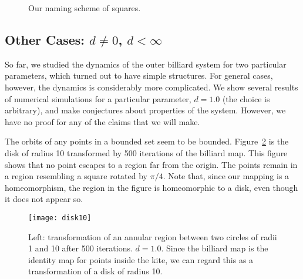 \documentclass[10pt,twoside,draft]{book}
\begin{document}
\begin{figure}[ht]
  \centering

  \caption{Our naming scheme of squares.}
  \label{fig:grid}

\end{figure}

\subsection*{Other Cases: $d \neq 0$, $d < \infty$}
So far, we studied the dynamics of the outer billiard system for two particular parameters, which turned out to have simple structures.
For general cases, however, the dynamics is considerably more complicated.
We show several results of numerical simulations for a particular parameter, $d = 1.0$ (the choice is arbitrary), and make conjectures about properties of the system.
However, we have no proof for any of the claims that we will make.

The orbits of any points in a bounded set seem to be bounded.
Figure~\ref{fig:disk10} is the disk of radius 10 transformed by 500 iterations of the billiard map.
This figure shows that no point escapes to a region far from the origin.
The points remain in a region resembling a square rotated by $\pi/4$.
Note that, since our mapping is a homeomorphism, the region in the figure is homeomorphic to a disk, even though it does not appear so.
\begin{figure}[ht]
  \begin{center}
    \texttt{[image: disk10]}
    \caption{Left: transformation of an annular region between two circles of radii 1 and 10 after 500 iterations.
      $d = 1.0$.
      Since the billiard map is the identity map for points inside the kite, we can regard this as a transformation of a disk of radius 10.
    }
    \label{fig:disk10}
  \end{center}
\end{figure}
\end{document}
